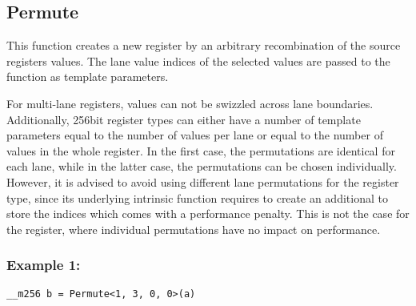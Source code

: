 \subsection{Permute}

This function creates a new register by an arbitrary recombination of the source registers values. 
The lane value indices of the selected values are passed to the function as template parameters.

For multi-lane registers, values can not be swizzled across lane boundaries. 
Additionally, 256bit register types can either have a number of template parameters equal to the number of values per lane or equal to the number of values in the whole register.
In the first case, the permutations are identical for each lane, while in the latter case, the permutations can be chosen individually.
However, it is advised to avoid using different lane permutations for the   register type, since its underlying intrinsic function requires to create an additional  to store the indices which comes with a performance penalty.
This is not the case for the  register, where individual permutations have no impact on performance.

\vspace{1cm}
\begin{minipage}{\linewidth}
\subsubsection*{Example 1:}
\begin{verbatim}
__m256 b = Permute<1, 3, 0, 0>(a)
\end{verbatim}

\end{minipage}

